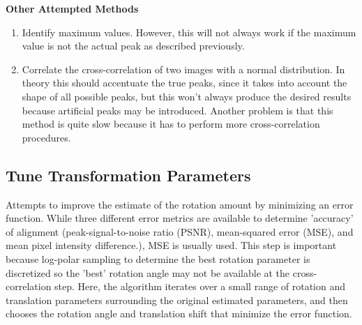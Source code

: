 \documentclass{article}
\begin{document}
\textbf{Other Attempted Methods}
\begin{enumerate}
\item Identify maximum values. However, this will not always work if the maximum value is not the actual peak as described previously. 
\item Correlate the cross-correlation of two images with a normal distribution. In theory this should accentuate the true peaks, since it takes into account the shape of all possible peaks, but this won't always produce the desired results because artificial peaks may be introduced. Another problem is that this method is quite slow because it has to perform more cross-correlation procedures. 
\end{enumerate}

\subsection{Tune Transformation Parameters}
Attempts to improve the estimate of the rotation amount by minimizing an error function. While three different error metrics are available to determine 'accuracy' of alignment (peak-signal-to-noise ratio (PSNR), mean-squared error (MSE), and mean pixel intensity difference.), MSE is usually used. This step is important because log-polar sampling to determine the best rotation parameter is discretized so the 'best' rotation angle may not be available at the cross-correlation step. Here, the algorithm iterates over a small range of rotation and translation parameters surrounding the original estimated parameters, and then chooses the rotation angle and translation shift that minimize the error function.
\end{document}
